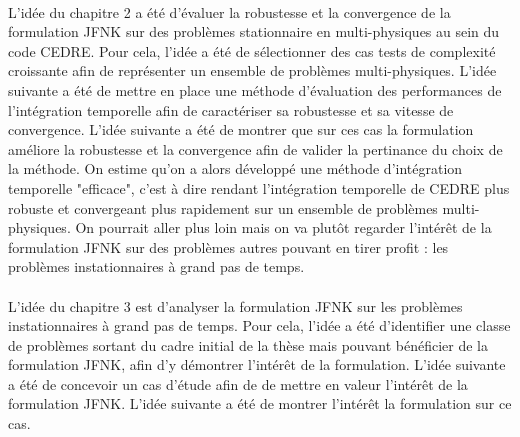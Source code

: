     \paragraph{}
    L'idée du chapitre 2 a été d'évaluer la robustesse et la convergence de la formulation JFNK sur des problèmes stationnaire en multi-physiques au sein du code CEDRE.
    Pour cela, l'idée a été de sélectionner des cas tests de complexité croissante afin de représenter un ensemble de problèmes multi-physiques.
    L'idée suivante a été de mettre en place une méthode d'évaluation des performances de l'intégration temporelle afin de caractériser sa robustesse et sa vitesse de convergence.
    L'idée suivante a été de montrer que sur ces cas la formulation améliore la robustesse et la convergence afin de valider la pertinance du choix de la méthode.
    On estime qu'on a alors développé une méthode d'intégration temporelle "efficace", c'est à dire rendant l'intégration temporelle de CEDRE plus robuste et convergeant plus rapidement sur un ensemble de problèmes multi-physiques.
    On pourrait aller plus loin mais on va plutôt regarder l'intérêt de la formulation JFNK sur des problèmes autres pouvant en tirer profit : les problèmes instationnaires à grand pas de temps.

    \paragraph{}
    L'idée du chapitre 3 est d'analyser la formulation JFNK sur les problèmes instationnaires à grand pas de temps.
    Pour cela, l'idée a été d'identifier une classe de problèmes sortant du cadre initial de la thèse mais pouvant bénéficier de la formulation JFNK, afin d'y démontrer l'intérêt de la formulation.
    L'idée suivante a été de concevoir un cas d'étude afin de de mettre en valeur l'intérêt de la formulation JFNK.
    L'idée suivante a été de montrer l’intérêt la formulation sur ce cas.
